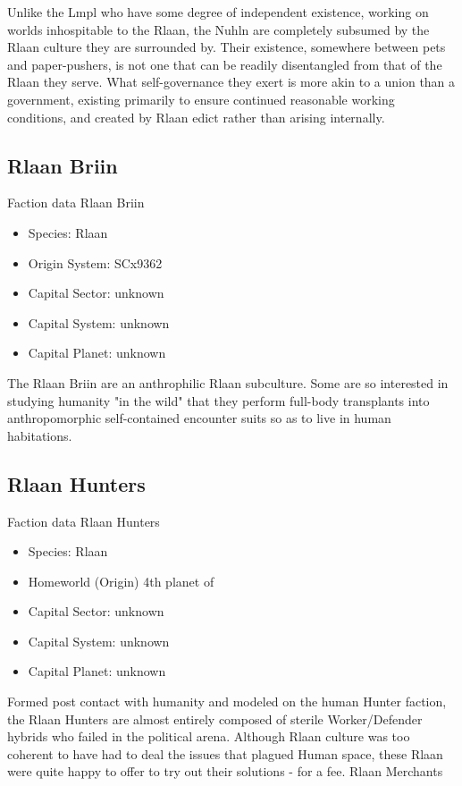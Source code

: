 Unlike the Lmpl who have some degree of independent existence, working
on worlds inhospitable to the Rlaan, the Nuhln are completely subsumed
by the Rlaan culture they are surrounded by. Their existence,
somewhere between pets and paper-pushers, is not one that can be
readily disentangled from that of the Rlaan they serve. What
self-governance they exert is more akin to a union than a government,
existing primarily to ensure continued reasonable working conditions,
and created by Rlaan edict rather than arising internally.
 
\subsection{Rlaan Briin}

Faction data Rlaan Briin
\begin{itemize}
\item Species: Rlaan
\item Origin System: SCx9362
\item Capital Sector: unknown
\item Capital System: unknown
\item Capital Planet: unknown
\end{itemize}

The Rlaan Briin are an anthrophilic Rlaan subculture. Some are so
interested in studying humanity "in the wild" that they perform
full-body transplants into anthropomorphic self-contained encounter
suits so as to live in human habitations.
 
\subsection{Rlaan Hunters}

Faction data Rlaan Hunters
\begin{itemize}
\item Species: Rlaan
\item Homeworld (Origin) 4th planet of 
\item Capital Sector: unknown
\item Capital System: unknown
\item Capital Planet: unknown
\end{itemize}

Formed post contact with humanity and modeled on the human Hunter
faction, the Rlaan Hunters are almost entirely composed of sterile
Worker/Defender hybrids who failed in the political arena. Although
Rlaan culture was too coherent to have had to deal the issues that
plagued Human space, these Rlaan were quite happy to offer to try out
their solutions - for a fee.  Rlaan Merchants

